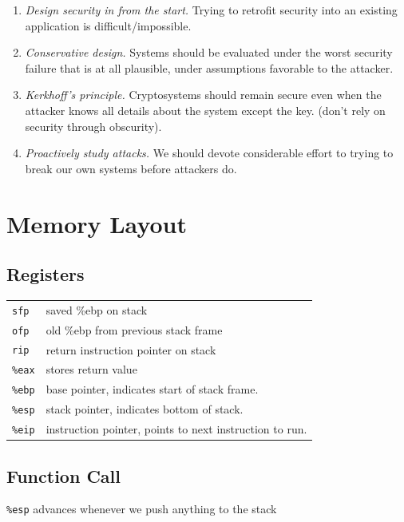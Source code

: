 \documentclass[10pt,landscape]{article}
\begin{document}
\begin{multicols}{3}
\begin{enumerate}
    \item \textit{Design security in from the start.} Trying to retrofit security into an existing application is difficult/impossible.
    \item \textit{Conservative design.} Systems should be evaluated under the worst security failure that is at all plausible, under assumptions favorable to the attacker.
    \item \textit{Kerkhoff's principle.} Cryptosystems should remain secure even when the attacker knows all details about the system except the key. (don't rely on security through obscurity).
    \item \textit{Proactively study attacks.} We should devote considerable effort to trying to break our own systems before attackers do.
\end{enumerate}


\section{Memory Layout}

\subsection{Registers}

\begin{tabular}{@{}ll@{}}
\texttt{sfp}    & saved \%ebp on stack \\
\texttt{ofp}    & old \%ebp from previous stack frame \\
\texttt{rip}    & return instruction pointer on stack \\
\texttt{\%eax}  & stores return value \\
\texttt{\%ebp}  & base pointer, indicates start of stack frame. \\
\texttt{\%esp}  & stack pointer, indicates bottom of stack. \\
\texttt{\%eip}  & instruction pointer, points to next instruction to run. \\
\end{tabular}

\subsection{Function Call}

\texttt{\%esp} advances whenever we push anything to the stack


\end{multicols}
\end{document}
